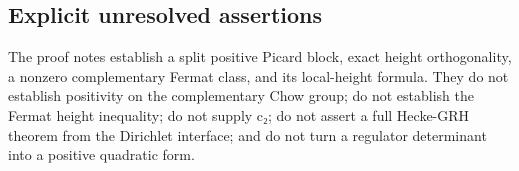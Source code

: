\subsection{Explicit unresolved
assertions}\label{explicit-unresolved-assertions}

The proof notes establish a split positive Picard block, exact height
orthogonality, a nonzero complementary Fermat class, and its
local-height formula. They do not establish positivity on the
complementary Chow group; do not establish the Fermat height inequality;
do not supply c₂; do not assert a full Hecke-GRH theorem from the
Dirichlet interface; and do not turn a regulator determinant into a
positive quadratic form.
